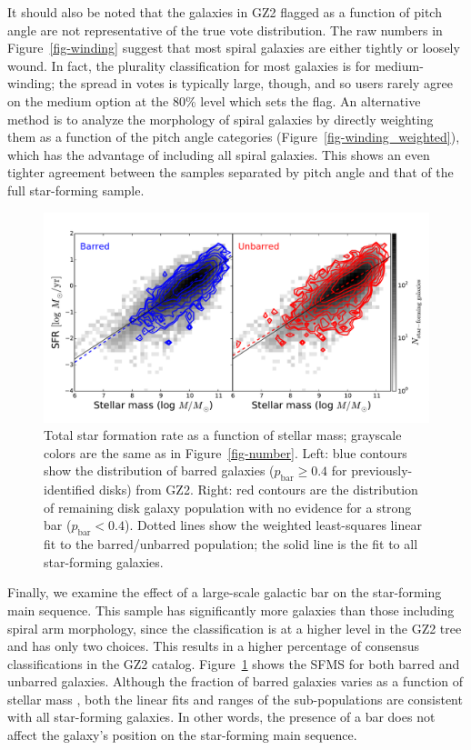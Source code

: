 \documentclass[useAMS,usenatbib]{mn2e}
\begin{document}
It should also be noted that the galaxies in GZ2 flagged as a function of pitch angle are not representative of the true vote distribution. The raw numbers in Figure~\ref{fig-winding} suggest that most spiral galaxies are either tightly or loosely wound. In fact, the plurality classification for most galaxies is for medium-winding; the spread in votes is typically large, though, and so users rarely agree on the medium option at the 80\% level which sets the flag. An alternative method is to analyze the morphology of spiral galaxies by directly weighting them as a function of the pitch angle categories (Figure~\ref{fig-winding_weighted}), which has the advantage of including all spiral galaxies. This shows an even tighter agreement between the samples separated by pitch angle and that of the full star-forming sample.

\begin{figure}
\includegraphics[angle=0,width=7.0in]{figures/ms_bar_contour.pdf}
\caption{Total star formation rate as a function of stellar mass; grayscale colors are the same as in Figure~\ref{fig-number}. Left: blue contours show the distribution of barred galaxies ($p_\textrm{bar}\ge0.4$ for previously-identified disks) from GZ2. Right: red contours are the distribution of remaining disk galaxy population with no evidence for a strong bar ($p_\textrm{bar}<0.4$). Dotted lines show the weighted least-squares linear fit to the barred/unbarred population; the solid line is the fit to all star-forming galaxies. 
\label{fig-bar}}
\end{figure}

Finally, we examine the effect of a large-scale galactic bar on the star-forming main sequence. This sample has significantly more galaxies than those including spiral arm morphology, since the classification is at a higher level in the GZ2 tree and has only two choices. This results in a higher percentage of consensus classifications in the GZ2 catalog. Figure~\ref{fig-bar} shows the SFMS for both barred and unbarred galaxies. Although the fraction of barred galaxies varies as a function of stellar mass \citep{she08a,cam10,mas11c,che13}, both the linear fits and ranges of the sub-populations are consistent with all star-forming galaxies. In other words, the presence of a bar does not affect the galaxy's position on the star-forming main sequence. 
\end{document}
